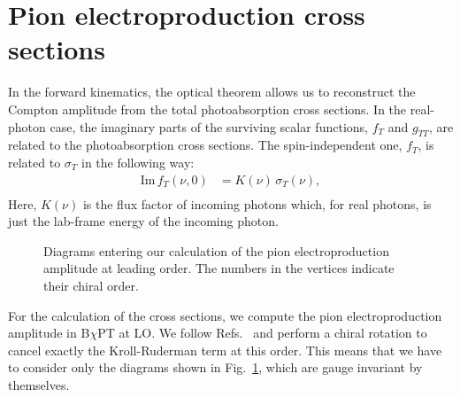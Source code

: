 \documentclass[11pt,preprint,tightenlines,
showpacs,preprintnumbers,amsmath,amssymb,superscriptaddress,a4paper,nofootinbib]{revtex4-1}
\begin{document}




\section{Pion electroproduction cross sections}\label{App:CrossSections}

In the forward kinematics, the optical theorem allows us to reconstruct the Compton amplitude from the total photoabsorption cross sections. 
In the real-photon case, the imaginary parts of the surviving scalar functions, $f_T$ and $g_{TT}$, are related to the photoabsorption cross sections. 
The spin-independent one, $f_T$, is related to  $\sigma_T$ in the following way:
\begin{subequations}
\begin{align}
\text{Im}\, f_T(\nu, 0)&= K(\nu)\, \sigma_T(\nu), \label{Eq:ImfTRealPhoton}\\
\end{align}
\end{subequations}
Here, $K(\nu)$ is the flux factor of incoming photons which, for  real photons, is just the lab-frame energy of the incoming photon.

\begin{figure}
\begin{center}
\caption{Diagrams entering our calculation of the pion electroproduction amplitude at leading order. The numbers in the vertices indicate their chiral order.\label{Fig:DiagsOp}}
\end{center}
\end{figure}

For the calculation of the cross sections, we compute the pion electroproduction amplitude in B$\chi$PT at LO.
We follow Refs.~\cite{Holstein:2005db,Lensky:2009uv} and perform a chiral rotation to cancel exactly the Kroll-Ruderman term at this order.
This means that we have to consider only the diagrams shown in Fig.~\ref{Fig:DiagsOp}, which are gauge invariant by themselves.
\end{document}

